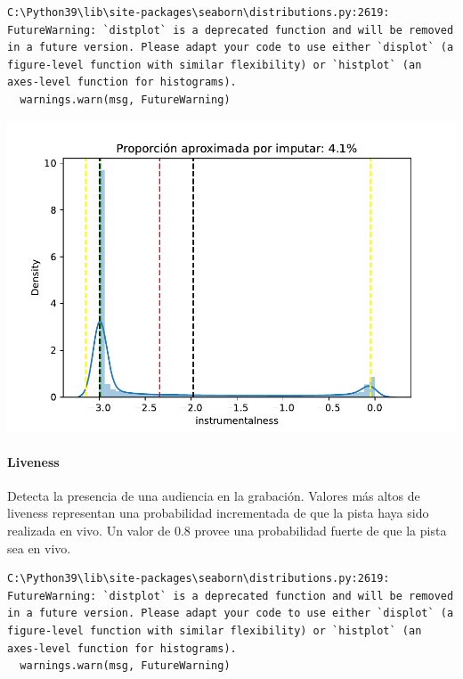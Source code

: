 \documentclass[
  letterpaper,
  DIV=11,
  numbers=noendperiod]{scrartcl}
\let\oldparagraph\paragraph
\renewcommand{\paragraph}[1]{\oldparagraph{#1}\mbox{}}
\begin{document}
\begin{verbatim}
C:\Python39\lib\site-packages\seaborn\distributions.py:2619: FutureWarning: `distplot` is a deprecated function and will be removed in a future version. Please adapt your code to use either `displot` (a figure-level function with similar flexibility) or `histplot` (an axes-level function for histograms).
  warnings.warn(msg, FutureWarning)
\end{verbatim}

\includegraphics{informe_01_files/figure-pdf/unnamed-chunk-12-3.pdf}

\hypertarget{liveness}{%
\paragraph{Liveness}\label{liveness}}

Detecta la presencia de una audiencia en la grabación. Valores más altos
de liveness representan una probabilidad incrementada de que la pista
haya sido realizada en vivo. Un valor de 0.8 provee una probabilidad
fuerte de que la pista sea en vivo.

\begin{verbatim}
C:\Python39\lib\site-packages\seaborn\distributions.py:2619: FutureWarning: `distplot` is a deprecated function and will be removed in a future version. Please adapt your code to use either `displot` (a figure-level function with similar flexibility) or `histplot` (an axes-level function for histograms).
  warnings.warn(msg, FutureWarning)
\end{verbatim}
\end{document}

